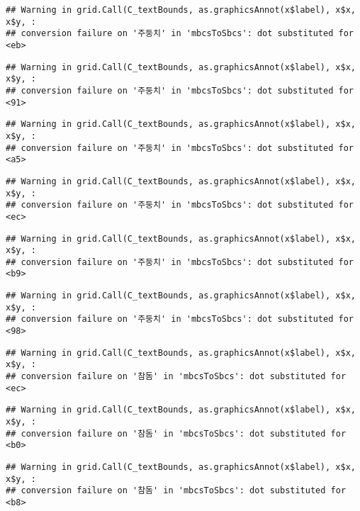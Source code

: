 \documentclass[
]{article}
\begin{document}
\begin{verbatim}
## Warning in grid.Call(C_textBounds, as.graphicsAnnot(x$label), x$x, x$y, :
## conversion failure on '주둥치' in 'mbcsToSbcs': dot substituted for <eb>
\end{verbatim}

\begin{verbatim}
## Warning in grid.Call(C_textBounds, as.graphicsAnnot(x$label), x$x, x$y, :
## conversion failure on '주둥치' in 'mbcsToSbcs': dot substituted for <91>
\end{verbatim}

\begin{verbatim}
## Warning in grid.Call(C_textBounds, as.graphicsAnnot(x$label), x$x, x$y, :
## conversion failure on '주둥치' in 'mbcsToSbcs': dot substituted for <a5>
\end{verbatim}

\begin{verbatim}
## Warning in grid.Call(C_textBounds, as.graphicsAnnot(x$label), x$x, x$y, :
## conversion failure on '주둥치' in 'mbcsToSbcs': dot substituted for <ec>
\end{verbatim}

\begin{verbatim}
## Warning in grid.Call(C_textBounds, as.graphicsAnnot(x$label), x$x, x$y, :
## conversion failure on '주둥치' in 'mbcsToSbcs': dot substituted for <b9>
\end{verbatim}

\begin{verbatim}
## Warning in grid.Call(C_textBounds, as.graphicsAnnot(x$label), x$x, x$y, :
## conversion failure on '주둥치' in 'mbcsToSbcs': dot substituted for <98>
\end{verbatim}

\begin{verbatim}
## Warning in grid.Call(C_textBounds, as.graphicsAnnot(x$label), x$x, x$y, :
## conversion failure on '참돔' in 'mbcsToSbcs': dot substituted for <ec>
\end{verbatim}

\begin{verbatim}
## Warning in grid.Call(C_textBounds, as.graphicsAnnot(x$label), x$x, x$y, :
## conversion failure on '참돔' in 'mbcsToSbcs': dot substituted for <b0>
\end{verbatim}

\begin{verbatim}
## Warning in grid.Call(C_textBounds, as.graphicsAnnot(x$label), x$x, x$y, :
## conversion failure on '참돔' in 'mbcsToSbcs': dot substituted for <b8>
\end{verbatim}
\end{document}
